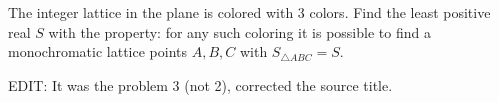 The integer lattice in the plane is colored with 3 colors. Find the least positive real $S$ with the property: for any such coloring it is possible to find a monochromatic lattice points $A,B,C$ with $S_{\triangle ABC}=S$.



EDIT: It was the problem 3 (not 2), corrected the source title.